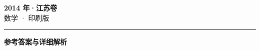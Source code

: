 \documentclass[zihao=5, a4paper]{ctexart}
\begin{document}
\begin{center}
  {\Large\bfseries 2014 年·江苏卷}\\[4pt]
  {\large 数学 · 印刷版}
\end{center}
\medskip
{}

\par\bigskip\hrule\bigskip
{}
\Needspace{0.55\textheight}
\begin{center}{\large\bfseries 参考答案与详细解析}\end{center}
\smallskip

\end{document}
